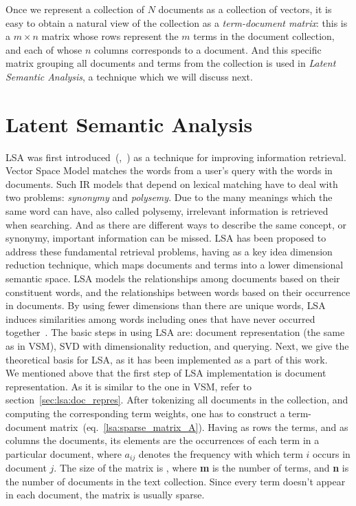 Once we represent a collection of $N$ documents as a collection of vectors, it is easy to obtain a natural view of the collection as a \textit{term-document matrix}: this is a $m \times n$ matrix whose rows represent the $m$ terms in the document collection, and each of whose $n$ columns corresponds to a document. And this specific matrix grouping all documents and terms from the collection is used in \textit{Latent Semantic Analysis}, a technique which we will discuss next.\\

\section{Latent Semantic Analysis}
\gls{LSA} was first introduced~(\cite{Dumais88usingLSA},~\cite{Deerw90_LSA}) as a technique for improving information retrieval. Vector Space Model matches the words from a user's query with the words in documents. Such \gls{IR} models that depend on lexical matching have to deal with two problems: \textit{synonymy} and \textit{polysemy}. Due to the many meanings which the same word can have, also called polysemy, irrelevant information is retrieved when searching. And as there are different ways to describe the same concept, or synonymy, important information can be missed. \gls{LSA} has been proposed to address these fundamental retrieval problems, having as a key idea dimension reduction technique, which maps documents and terms into a lower dimensional semantic space. \gls{LSA} models the relationships among documents based on their constituent words, and the relationships between words based on their occurrence in documents. By using fewer dimensions than there are unique words, \gls{LSA} induces similarities among words including ones that have never occurred together~\cite{Dumais2006}. The basic steps in using \gls{LSA} are: document representation (the same as in \gls{VSM}), \gls{SVD} with dimensionality reduction, and querying. Next, we give the theoretical basis for \gls{LSA}, as it has been implemented as a part of this work. \\


We mentioned above that the first step of \gls{LSA} implementation is document representation. As it is similar to the one in \gls{VSM}, refer to section~\ref{sec:lsa:doc_repres}. After tokenizing all documents in the collection, and computing the corresponding term weights, one has to construct a term-document matrix~(eq.~\ref{lsa:sparse_matrix_A}). Having as rows the terms, and as columns the documents, its elements are the occurrences of each term in a particular document, where $ a_{ij} $ denotes the frequency with which term $ i $ occurs in document $ j $. The size of the matrix is , where {\bf m} is the number of terms, and {\bf n} is the number of documents in the text collection. Since every term doesn't appear in each document, the matrix is usually sparse. \\

